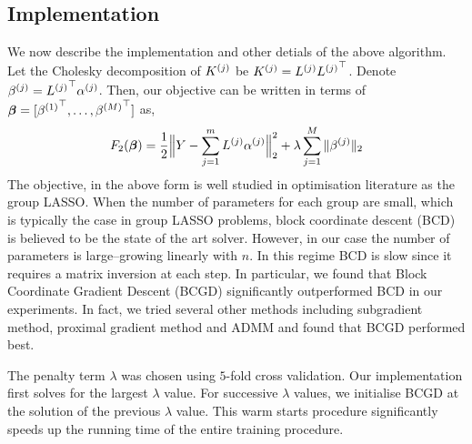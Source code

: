\subsection{Implementation}

We now describe the implementation and other detials of the above algorithm.
Let the Cholesky decomposition of ${K^{(j)}}$ be ${K^{(j)}} = {L^{(j)}} {L^{(j)}}^\top$. 
Denote ${\beta^{(j)}} = {L^{(j)}}^\top {\alpha^{(j)}}$.
Then, our objective can be written in terms of ${\bm{\beta}} = [{\beta^{(1)}}^\top,
\dots, {\beta^{(M)}}^\top]$ as,
\begin{equation}
F_2({\bm{\beta}}) =  \frac{1}{2}\Big\|Y - \sum_{j=1}^m {L^{(j)}} {\alpha^{(j)}}\Big\|_2^2 + 
  \lambda \sum_{j=1}^M \|{\beta^{(j)}}\|_2
\end{equation}
The objective, in the above form is well studied in optimisation literature as the group
LASSO. 
When the number of parameters for each group are small, which is
typically the case in group LASSO problems, block coordinate descent (BCD) is believed
to be the state of the art solver. However, in our case the number of parameters
is large--growing linearly with $n$. In this regime BCD is slow since it
requires a matrix inversion at each step. In particular, we found that Block
Coordinate Gradient Descent (BCGD) significantly outperformed BCD in our
experiments. 
In fact, we tried several other methods including subgradient method, proximal
gradient method and ADMM and found that BCGD performed best.

The penalty term $\lambda$ was chosen using $5$-fold cross validation. Our implementation
first solves for the largest $\lambda$ value. For successive $\lambda$
values, we initialise BCGD at the solution of the previous $\lambda$ value. This
warm starts procedure significantly speeds up the running time of the entire
training procedure.

